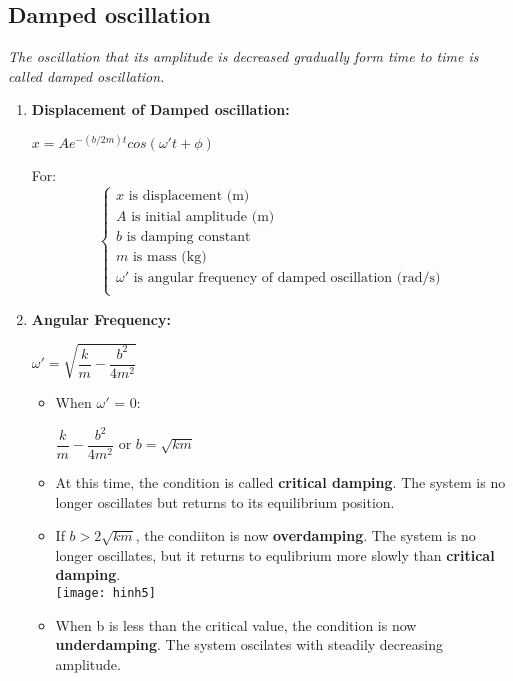 \documentclass[10pt]{article}
\begin{document}
\subsection{Damped oscillation}
\textit{The oscillation that its amplitude is decreased gradually form time to time is called damped oscillation.}
\begin{enumerate}
	\item \textbf{Displacement of Damped oscillation: } \\
	\begin{mybox}
		\begin{center}
			$x = Ae^{-(b / 2m)t} cos( \omega ' t + \phi)$
		\end{center}
	\end{mybox}
	For: \\
	$$
	\begin{cases}
	x \mbox{ is displacement (m)} \\
	A \mbox{ is initial amplitude (m)} \\
	b \mbox{ is damping constant} \\
	m \mbox{ is mass (kg)} \\
	\omega' \mbox{ is angular frequency of damped oscillation (rad/s)} \\
	\end{cases}
	$$
	\item \textbf{Angular Frequency: } \\
	\begin{mybox}
		\begin{center}
			$\omega '  = \sqrt{\dfrac{k}{m} - \dfrac{b^{2}}{4 m^{2}}}$
		\end{center}
	\end{mybox}

	\begin{itemize}
		\item When $\omega'$ = 0:
		\begin{mybox}
			\begin{center}
				 $\dfrac{k}{m} - \dfrac{b^{2}}{4 m^{2}} \mbox{ or } b = \sqrt{km}$
			\end{center}
		\end{mybox}
		\item At this time, the condition is called \textbf{critical damping}. The system is no longer oscillates but returns to its equilibrium position.
		\item If $b > 2 \sqrt{km}$, the condiiton is now \textbf{overdamping}. The system is no longer oscillates, but it returns to equlibrium more slowly than \textbf{critical damping}. \\
		\texttt{[image: hinh5]}
		\item When b is less than the critical value, the condition is now \textbf{underdamping}. The system oscilates with steadily decreasing amplitude.
	\end{itemize}


\end{enumerate}
\end{document}
